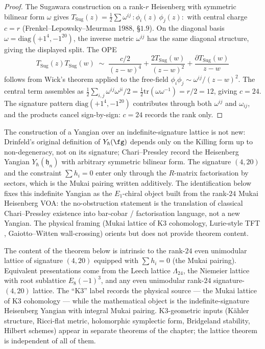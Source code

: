 \begin{proof}
The Sugawara construction on a rank-$r$ Heisenberg with symmetric
bilinear form $\omega$ gives
$T_{\mathrm{Sug}}(z) = \tfrac{1}{2} \sum \omega^{ij}\, {:}\phi_i(z)\, \phi_j(z){:}$
with central charge $c = r$ (Frenkel--Lepowsky--Meurman 1988, \S$1.9$).
On the diagonal basis $\omega = \mathrm{diag}(+1^4, -1^{20})$, the
inverse metric $\omega^{ij}$ has the same diagonal structure, giving
the displayed split. The OPE
\[
 T_{\mathrm{Sug}}(z) T_{\mathrm{Sug}}(w) \;\sim\; \frac{c/2}{(z - w)^4} + \frac{2 T_{\mathrm{Sug}}(w)}{(z - w)^2} + \frac{\partial T_{\mathrm{Sug}}(w)}{z - w}
\]
follows from Wick's theorem applied to the free-field
$\phi_i \phi_j \sim \omega^{ij}/(z - w)^2$. The central term assembles
as $\tfrac{1}{2} \sum_{i, j} \omega^{ij} \omega^{ji} / 2 = \tfrac{1}{2} \mathrm{tr}(\omega \omega^{-1}) = r / 2 = 12$, giving $c = 24$. The signature pattern
$\mathrm{diag}(+1^4, -1^{20})$ contributes through both $\omega^{ij}$
and $\omega_{ij}$, and the products cancel sign-by-sign: $c = 24$
records the rank only.
\end{proof}

\begin{remark}
\label{rem:mukai-indefinite-yangian-classical}
The construction of a Yangian over an indefinite-signature lattice is
not new: Drinfeld's original definition \cite{Drinfeld1985,Drinfeld1988}
of $Y_\hbar(\fg)$ depends only on the Killing form up to non-degeneracy,
not on its signature; Chari--Pressley \cite{ChariPressley1995} record
the Heisenberg Yangian $Y_\hbar(\mathfrak{h}_n)$ with arbitrary symmetric
bilinear form. The signature $(4, 20)$ and the constraint $\sum h_i = 0$
enter only through the $R$-matrix factorisation by sectors, which is the
Mukai pairing written additively. The identification below fixes this
indefinite Yangian as the $E_1$-chiral object built from the rank-$24$
Mukai Heisenberg VOA: the no-obstruction statement is the translation
of classical Chari--Pressley existence into bar-cobar / factorisation
language, not a new Yangian. The
physical framing (Mukai lattice of K3 cohomology, Lurie-style TFT
\cite{AyalaFrancis2015,AyalaFrancis2015b}, Gaiotto--Witten wall-crossing)
orients but does not provide theorem content.
\end{remark}

\begin{remark}
\label{rem:k3-yangian-lattice-scope}
The content of the theorem below is intrinsic to the rank-$24$ even
unimodular lattice of signature $(4, 20)$ equipped with
$\sum h_i = 0$ (the Mukai pairing). Equivalent presentations come
from the Leech lattice $\Lambda_{24}$, the Niemeier lattice with root
sublattice $E_8(-1)^3$, and any even unimodular rank-$24$
signature-$(4, 20)$ lattice. The ``K3'' label records the physical
source — the Mukai lattice of K3 cohomology — while the mathematical
object is the indefinite-signature Heisenberg Yangian with integral
Mukai pairing. K3-geometric inputs (K\"ahler structure, Ricci-flat
metric, holomorphic symplectic form, Bridgeland stability, Hilbert
schemes) appear in separate theorems of the chapter; the lattice
theorem is independent of all of them.
\end{remark}

